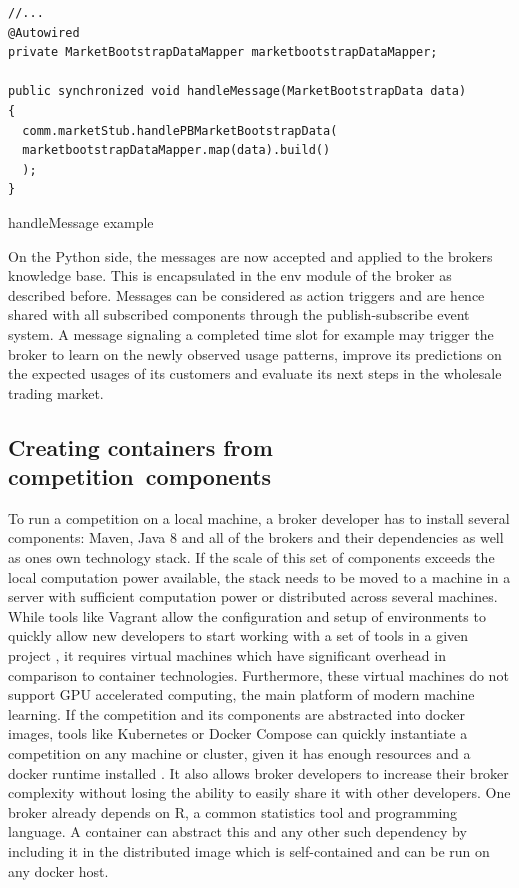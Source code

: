 \begin{listing}
    \begin{verbatim}
//...
@Autowired
private MarketBootstrapDataMapper marketbootstrapDataMapper;

public synchronized void handleMessage(MarketBootstrapData data)
{
  comm.marketStub.handlePBMarketBootstrapData(
  marketbootstrapDataMapper.map(data).build()
  );
}
    \end{verbatim}
    \caption{handleMessage example}
    \label{lst:handlemessageexample}
\end{listing}

On the Python side, the messages are now accepted and applied to the brokers knowledge base. This is encapsulated in the
env module of the broker as described before. Messages can be considered as action triggers and are hence
shared with all subscribed components through the publish-subscribe event system. A message signaling a completed
time slot for example may trigger the broker to learn on the newly observed usage patterns, improve its predictions on
the expected usages of its customers and evaluate its next steps in the wholesale trading market.

\subsection{Creating containers from competition\ components}
\label{sec:creating_containers_from_competition_components}

To run a competition on a local machine, a broker developer has to install several components: Maven, Java 8 and all of the brokers and
their dependencies as well as ones own technology stack. If the scale of this set of components exceeds the local
computation power available, the stack needs to be moved to a machine in a server with sufficient computation power or
distributed across several machines.
While tools like Vagrant allow
the configuration and setup of environments to quickly allow new developers to start working with a set of tools in a
given project \citep{vagrant} , it requires virtual machines which have significant overhead in comparison to container
technologies. Furthermore, these virtual machines do not support \ac{GPU} accelerated computing, the main platform of
modern machine learning. If the competition and its components are abstracted into docker images, tools like Kubernetes
or Docker Compose can quickly instantiate a competition on any machine or cluster, given it has enough resources and a
docker runtime installed \citep{docker}. It also allows broker developers to increase their broker complexity without
losing the ability to easily share it with other developers. One broker already depends on R, a common statistics tool
and programming language. A container can abstract this and any other such dependency by including it in
the distributed image which is self-contained and can be run on any docker host.


